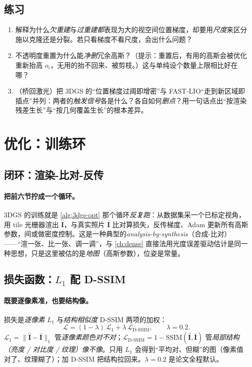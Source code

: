 \subsection*{练习}
\begin{enumerate}
  \item 解释为什么\emph{欠重建}与\emph{过重建}\emph{都}表现为大的视空间位置梯度，却要用\emph{尺度}来区分施以克隆还是分裂。若只看梯度不看尺度，会出什么问题？
  \item 不透明度重置为什么能\emph{净删}冗余高斯？（提示：重置后，有用的高斯会被优化重新抬高 $o_i$，无用的抬不回来、被剪枝。）这与单纯设个数量上限相比好在哪？
  \item （桥回激光）把 3DGS 的“位置梯度过阈即增密”与 FAST-LIO“走到新区域即插点”并列：两者的\emph{触发信号}各是什么？各自如何\emph{删点}？用一句话点出“按渲染残差生长”与“按几何覆盖生长”的根本差异。
\end{enumerate}

\section{优化：训练环}
\label{sec:3dgs-opt}

\subsection{闭环：渲染-比对-反传}

\paragraph{把前六节拧成一个循环。}
3DGS 的训练就是 \cref{alg:3dgs-opt} 那个循环\emph{反复跑}：从数据集采一个已标定视角，用 tile 光栅器渲出 $\hat{\mathbf I}$，与真实照片 $\bar{\mathbf I}$ 比对算损失，反传梯度、Adam 更新所有高斯参数，间或做密度控制。这是一种典型的\emph{analysis-by-synthesis}（合成-比对）——“渲一张、比一张、调一调”，与 \cref{ch:dense} 直接法用光度误差驱动估计是同一种思想，只是这里被估的是\emph{地图}（高斯参数），位姿是常量。

\subsection{损失函数：\texorpdfstring{$L_1$}{L_1} 配 D-SSIM}

\paragraph{既要逐像素准，也要结构像。}
损失是\emph{逐像素} $L_1$ 与\emph{结构相似度} D-SSIM 两项的加权：
\begin{equation}
  \mathcal L=(1-\lambda)\,\mathcal L_1+\lambda\,\mathcal L_{\mathrm{D\text{-}SSIM}},\qquad \lambda=0.2.
  \label{eq:3dgs-loss}
\end{equation}
$\mathcal L_1=\lVert\hat{\mathbf I}-\bar{\mathbf I}\rVert_1$ 管\emph{逐像素颜色对不对}；$\mathcal L_{\mathrm{D\text{-}SSIM}}=1-\mathrm{SSIM}(\hat{\mathbf I},\bar{\mathbf I})$ 管\emph{局部结构（亮度 / 对比度 / 纹理）像不像}。只用 $L_1$ 会得到“平均对、但糊”的图（像素值对了、纹理糊了）；加 D-SSIM 把结构拉回来。$\lambda=0.2$ 是论文全程默认。

